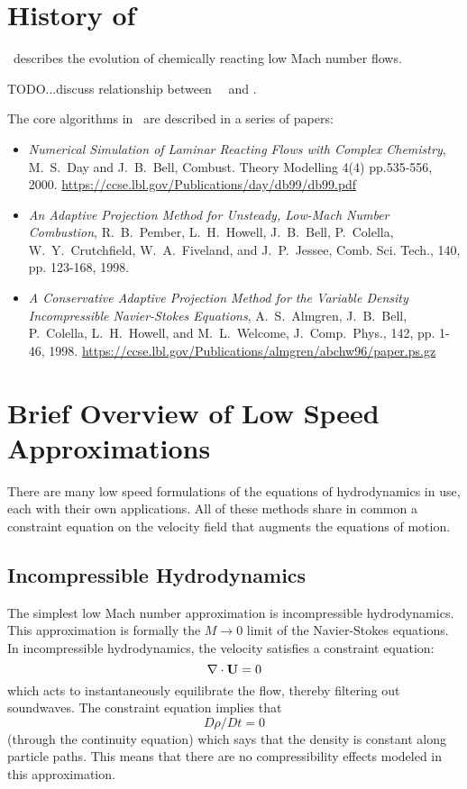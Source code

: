 \section{History of \lmc}

\lmc\ describes the evolution of chemically reacting low Mach number flows.

TODO...discuss relationship between \boxlib\, \iamr\ and \lmc.

The core algorithms in \lmc\ are described in a series of papers:
\begin{itemize}
\item {\it Numerical Simulation of Laminar Reacting Flows with Complex Chemistry}, M.~S.~Day and J.~B.~Bell,
  Combust. Theory Modelling 4(4) pp.535-556, 2000.
  \url{https://ccse.lbl.gov/Publications/day/db99/db99.pdf}

\item {\it An Adaptive Projection Method for Unsteady, Low-Mach Number Combustion}, 
  R.~B.~Pember, L.~H.~Howell, J.~B.~Bell, P.~Colella, W.~Y.~Crutchfield, W.~A.~Fiveland, and J.~P.~Jessee,
  Comb. Sci. Tech., 140, pp. 123-168, 1998.

\item {\it A Conservative Adaptive Projection Method for the Variable Density Incompressible Navier-Stokes Equations},
  A.~S.~Almgren, J.~B.~Bell, P.~Colella, L.~H.~Howell, and M.~L.~Welcome, J.~Comp.~Phys., 142, pp. 1-46, 1998.
  \url{https://ccse.lbl.gov/Publications/almgren/abchw96/paper.ps.gz}

\end{itemize}         

\section{Brief Overview of Low Speed Approximations}

There are many low speed formulations of the equations of hydrodynamics
in use, each with their own applications.  All of these methods share in
common a constraint equation on the velocity field that augments the
equations of motion.  

\subsection{Incompressible Hydrodynamics}

The simplest low Mach number approximation is incompressible
hydrodynamics. This approximation is formally the $M \rightarrow 0$
limit of the Navier-Stokes equations. In incompressible hydrodynamics,
the velocity satisfies a constraint equation:
\begin{equation}
\nabla \cdot {\bf U} = 0
\end{equation}
which acts to instantaneously equilibrate the flow, thereby filtering
out soundwaves.  The constraint equation implies that
\begin{equation}
D\rho/Dt = 0
\end{equation}
(through the continuity equation) which says that the density is
constant along particle paths. This means that there are no
compressibility effects modeled in this approximation.


